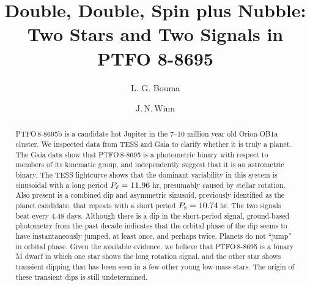 \documentclass[12pt,twocolumn,tighten]{aastex62}
\begin{document}

\title{Double, Double, Spin plus Nubble: Two Stars and Two Signals in
PTFO 8-8695}



%
%
\author[0000-0002-0514-5538]{L. G. Bouma}
%
\author[0000-0002-4265-047X]{J.\,N.\,Winn}

\begin{abstract}
  PTFO$\,$8-8695b is a candidate hot Jupiter in the 7--10 million year
  old Orion-OB1a cluster. We inspected data from TESS and Gaia to
  clarify whether it is truly a planet.  The Gaia data show that
  PTFO$\,$8-8695 is a photometric binary with respect to members of
  its kinematic group, and independently suggest that it is an
  astrometric binary.  The TESS lightcurve shows that the dominant
  variability in this system is sinusoidal with a long period $P_{\rm
  \ell}=11.96\,$hr, presumably caused by stellar rotation.  Also
  present is a combined dip and asymmetric sinusoid, previously
  identified as the planet candidate, that repeats with a short period
  $P_{\rm s}= 10.74\,$hr.  The two signals beat every 4.48 days.
  Although there is a dip in the short-period signal, ground-based
  photometry from the past decade indicates that the orbital phase of
  the dip seems to have instantaneously jumped, at least once, and
  perhaps twice.  Planets do not ``jump'' in orbital phase.  Given the
  available evidence, we believe that PTFO$\,$8-8695 is a binary M
  dwarf in which one star shows the long rotation signal, and the
  other star shows transient dipping that has been seen in a few other
  young low-mass stars.  The origin of these transient dips is still
  undetermined.
\end{abstract}

\end{document}
